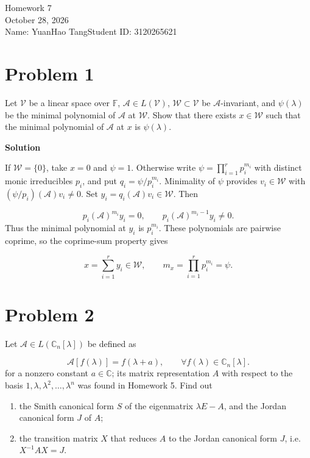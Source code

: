 \documentclass[UTF8,10pt,letterpaper,fontset=fandol]{ctexart}
\newcommand{\C}{\mathbb C}
\newcommand{\F}{\mathbb F}
\begin{document}
\begin{center}
{\LARGE Homework 7}\\[0.6em]
October 28, 2026\\[0.25em]
Name: YuanHao Tang\quad Student ID: 3120265621
\end{center}

\section{Problem 1}
Let $\mathcal V$ be a linear space over $\F$, $\mathcal A\in L(\mathcal V)$, $\mathcal W\subset\mathcal V$ be $\mathcal A$-invariant, and $\psi(\lambda)$ be the minimal polynomial of $\mathcal A$ at $\mathcal W$. Show that there exists $x\in\mathcal W$ such that the minimal polynomial of $\mathcal A$ at $x$ is $\psi(\lambda)$.

\par{}\textbf{Solution}\par
If $\mathcal W=\{0\}$, take $x=0$ and $\psi=1$. Otherwise write $\psi=\prod_{i=1}^r p_i^{m_i}$ with distinct monic irreducibles $p_i$, and put $q_i=\psi/p_i^{m_i}$. Minimality of $\psi$ provides $v_i\in\mathcal W$ with $(\psi/p_i)(\mathcal A)v_i\ne0$. Set $y_i=q_i(\mathcal A)v_i\in\mathcal W$. Then

\[
p_i(\mathcal A)^{m_i}y_i=0,\qquad p_i(\mathcal A)^{m_i-1}y_i\ne0.
\]
Thus the minimal polynomial at $y_i$ is $p_i^{m_i}$. These polynomials are pairwise coprime, so the coprime-sum property gives

\[
\boxed{x=\sum_{i=1}^r y_i\in\mathcal W,\qquad m_x=\prod_{i=1}^r p_i^{m_i}=\psi}.
\]

\section{Problem 2}
Let $\mathcal A\in L(\C_n[\lambda])$ be defined as

\[
\mathcal A[f(\lambda)]=f(\lambda+a),\qquad\forall f(\lambda)\in\C_n[\lambda].
\]
for a nonzero constant $a\in\C$; its matrix representation $A$ with respect to the basis $1,\lambda,\lambda^2,\ldots,\lambda^n$ was found in Homework 5. Find out

\begin{enumerate}
\item the Smith canonical form $S$ of the eigenmatrix $\lambda E-A$, and the Jordan canonical form $J$ of $A$;

\item the transition matrix $X$ that reduces $A$ to the Jordan canonical form $J$, i.e. $X^{-1}AX=J$.

\end{enumerate}
\end{document}
